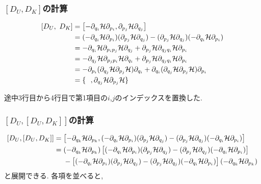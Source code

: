 \subsubsection{$[D_{U}, D_{K}]$の計算}
\begin{align}
  \left[D_{U},~D_{K}\right]
  &=
  \left[
    -\partial_{q_{i}} \mathcal{H} \partial_{p_{i}},
     \partial_{p_{j}} \mathcal{H} \partial_{q_{j}}
  \right]
  \notag \\
  &=
  (-\partial_{q_{i}} \mathcal{H} \partial_{p_{i}})
  ( \partial_{p_{j}} \mathcal{H} \partial_{q_{j}})
  -
  ( \partial_{p_{j}} \mathcal{H} \partial_{q_{j}})
  (-\partial_{q_{i}} \mathcal{H} \partial_{p_{i}})
  \notag \\
  &=
  -\partial_{q_{i}} \mathcal{H} \partial_{p_{i} p_{j}} \mathcal{H} \partial_{q_{j}}
  +\partial_{p_{j}} \mathcal{H} \partial_{q_{j} q_{i}} \mathcal{H} \partial_{p_{i}}
  \notag \\
  &=
  -\partial_{q_{j}} \mathcal{H} \partial_{p_{j} p_{i}} \mathcal{H} \partial_{q_{i}}
  +\partial_{p_{j}} \mathcal{H} \partial_{q_{j} q_{i}} \mathcal{H} \partial_{p_{i}}
  \notag \\
  &=
  -\partial_{p_{i}}
  (\partial_{q_{j}} \mathcal{H} \partial_{p_{j}} \mathcal{H})
  \partial_{q_{i}}
  +\partial_{q_{i}}
   (\partial_{q_{j}} \mathcal{H} \partial_{p_{j}} \mathcal{H})
   \partial_{p_{i}}
  \notag \\
  &=
  \{~~, \partial_{q_{j}} \mathcal{H} \partial_{p_{j}} \mathcal{H}\}
  \notag
\end{align}

途中3行目から4行目で第1項目の$i$,$j$のインデックスを置換した.

\subsubsection{$[D_{U}, [D_{U}, D_{K}]]$の計算}

\begin{align}
  \left[D_{U}, [D_{U}, D_{K}]\right]
  &=
  \left[
     -\partial_{q_{k}} \mathcal{H} \partial_{p_{k}},
     (-\partial_{q_{i}} \mathcal{H} \partial_{p_{i}})
     ( \partial_{p_{j}} \mathcal{H} \partial_{q_{j}})
     -
     ( \partial_{p_{j}} \mathcal{H} \partial_{q_{j}})
     (-\partial_{q_{i}} \mathcal{H} \partial_{p_{i}})
  \right]
  \notag \\
  &=
  (-\partial_{q_{k}} \mathcal{H} \partial_{p_{k}})
  \left[
    (-\partial_{q_{i}} \mathcal{H} \partial_{p_{i}})
    ( \partial_{p_{j}} \mathcal{H} \partial_{q_{j}})
    -
    ( \partial_{p_{j}} \mathcal{H} \partial_{q_{j}})
    (-\partial_{q_{i}} \mathcal{H} \partial_{p_{i}})
  \right]
  \notag \\
  &~~~~ -
  \left[
    (-\partial_{q_{i}} \mathcal{H} \partial_{p_{i}})
    ( \partial_{p_{j}} \mathcal{H} \partial_{q_{j}})
    -
    ( \partial_{p_{j}} \mathcal{H} \partial_{q_{j}})
    (-\partial_{q_{i}} \mathcal{H} \partial_{p_{i}})
  \right]
  (-\partial_{q_{k}} \mathcal{H} \partial_{p_{k}})
  \notag
\end{align}
と展開できる. 各項を並べると,

